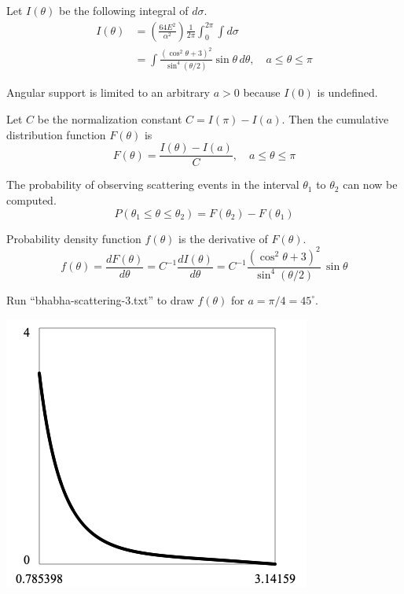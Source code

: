\documentclass[12pt]{article}
\begin{document}
\bigskip
\noindent
Let $I(\theta)$ be the following integral of $d\sigma$.
\begin{align*}
I(\theta)
&=\left(\frac{64E^2}{\alpha^2}\right)\frac{1}{2\pi}
\int_0^{2\pi}\int d\sigma
\\
&=\int\frac{\left(\cos^2\theta+3\right)^2}{\sin^4(\theta/2)}\sin\theta\,d\theta,
\quad a\le\theta\le\pi
\end{align*}

\noindent
Angular support is limited to an arbitrary $a>0$ because $I(0)$ is undefined.

\bigskip
\noindent
Let $C$ be the normalization constant $C=I(\pi)-I(a)$.
Then the cumulative distribution function $F(\theta)$ is
\begin{equation*}
F(\theta)=\frac{I(\theta)-I(a)}{C},
\quad a\le\theta\le\pi
\end{equation*}

\noindent
The probability of observing scattering events in the interval $\theta_1$ to $\theta_2$
can now be computed.
\begin{equation*}
P(\theta_1\le\theta\le\theta_2)=F(\theta_2)-F(\theta_1)
\end{equation*}

\noindent
Probability density function $f(\theta)$ is the derivative of $F(\theta)$.
\begin{equation*}
f(\theta)=\frac{dF(\theta)}{d\theta}=C^{-1}\frac{dI(\theta)}{d\theta}
=C^{-1}\frac{\left(\cos^2\theta+3\right)^2}{\sin^4(\theta/2)}\,\sin\theta
\end{equation*}

\noindent
Run ``bhabha-scattering-3.txt'' to draw $f(\theta)$ for $a=\pi/4=45^\circ$.

\begin{center}
\includegraphics[scale=0.5]{bhabha-scattering.png}
\end{center}
\end{document}
